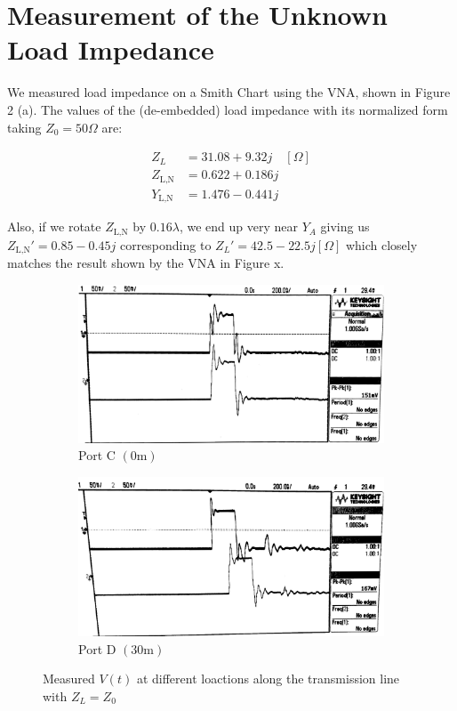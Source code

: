 \documentclass[10pt]{article}
\begin{document}
\section{Measurement of the Unknown Load Impedance}

We measured load impedance on a Smith Chart using the VNA, shown in Figure 2 (a). The values of the 
(de-embedded) load impedance with its normalized form taking $Z_0=50\Omega$ are: 

\begin{align*}
  Z_L &= 31.08 + 9.32j \quad [\Omega]\\
  Z_\text{L,N} &= 0.622 + 0.186j\\
  Y_\text{L,N} &= 1.476 - 0.441j
\end{align*}

Also, if we rotate $Z_\text{L,N}$ by $0.16\lambda$, we end up very near $Y_A$ giving us $Z_\text{L,N}' = 0.85 - 0.45j$ 
corresponding to $Z_L' = 42.5 - 22.5j [\Omega]$ which closely matches the result shown by the VNA in Figure x. 

\begin{figure}[ht]
  \centering
  \begin{subfigure}[b]{0.45\textwidth}
      \includegraphics[width=\textwidth]{../photos/lab1/v_t_pt_c.jpg}
      \caption{Port C $(0\text{m})$}
  \end{subfigure}
  \quad
  \begin{subfigure}[b]{0.45\textwidth}
      \includegraphics[width=\textwidth]{../photos/lab1/v_t_pt_d.jpg}
      \caption{Port D $(30\text{m})$}
  \end{subfigure}
  \caption{Measured $V(t)$ at different loactions along the transmission line with $Z_L = Z_0$ \vspace{-0.5cm}}
  \label{v_t_matched_tline}
\end{figure}
\end{document}
